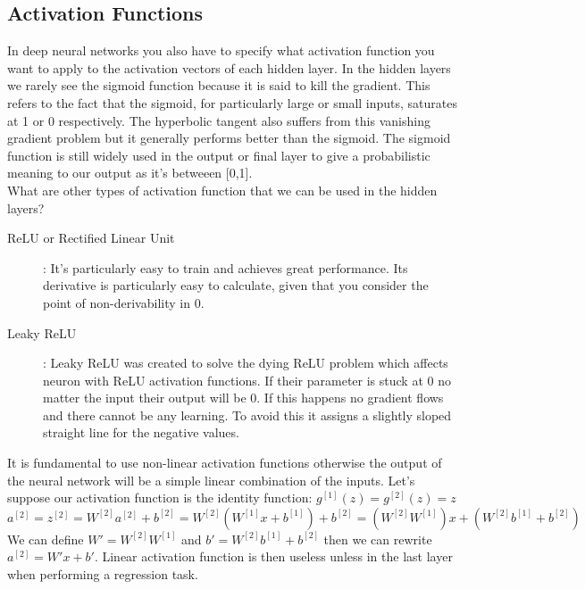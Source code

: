 \documentclass{article}
\begin{document}
\subsection*{Activation Functions}
In deep neural networks you also have to specify what activation function you want to apply to the activation vectors of each hidden layer. In the hidden layers we rarely see the sigmoid function because it is said to kill the gradient. This refers to the fact that the sigmoid, for particularly large or small inputs, saturates at 1 or 0 respectively. The hyperbolic tangent also suffers from this vanishing gradient problem but it generally performs better than the sigmoid. The sigmoid function is still widely used in the output or final layer to give a probabilistic meaning to our output as it's betweeen [0,1].\\
What are other types of activation function that we can be used in the hidden layers?
\begin{description}
    \item[ReLU or Rectified Linear Unit]:
        It's particularly easy to train and achieves great performance. Its derivative is particularly easy to calculate, given that you consider the point of non-derivability in 0. 
    \item[Leaky ReLU]: Leaky ReLU was created to solve the dying ReLU problem which affects neuron with ReLU activation functions. If their parameter is stuck at 0 no matter the input their output will be 0. If this happens no gradient flows and there cannot be any learning. To avoid this it assigns a slightly sloped straight line for the negative values.
\end{description}
It is fundamental to use non-linear activation functions otherwise the output of the neural network will be a simple linear combination of the inputs. Let's suppose our activation function is the identity function: $ g^{[1]}(z) = g^{[2]}(z) = z $ 
\[ 
    a^{[2]} = z^{[2]}= W^{[2]}a^{[2]}+b^{[2]} =  W^{[2]}(W^{[1]}x+b^{[1]})+b^{[2]} = (W^{[2]}W^{[1]})x + (W^{[2]}b^{[1]}+b^{[2]})
\]
We can define $ W' = W^{[2]}W^{[1]} $ and $ b'= W^{[2]}b^{[1]}+b^{[2]}$ then we can rewrite $ a^{[2]} = W'x +b'$. Linear activation function is then useless unless in the last layer when performing a regression task.
\end{document}
